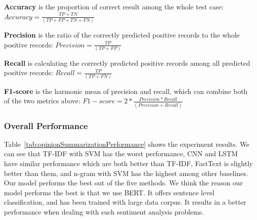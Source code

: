 \textbf{Accuracy} is the proportion of correct result among the whole test case: 
$ Accuracy = \frac{TP+TN}{(TP+FP+TN+FN)} $

\textbf{Precision} is the ratio of the correctly predicted positive records to the whole positive records:
$ Precision = \frac{TP}{(TP+FP)} $

\textbf{Recall} is calculating the correctly predicted positive records among all predicted positive records:
$ Recall = \frac{TP}{(TP+FN)} $

\textbf{F1-score}  is the harmonic mean of precision and recall, which can combine both of the two metrics above:
$ F1-score = 2*\frac{Precision*Recall}{(Precision+Recall)} $


\subsubsection{Overall Performance}
Table~\ref{tab:opinionSummarizationPerformance} shows the experiment results. We can see that TF-IDF with SVM has the worst performance, CNN and LSTM have similar performance which are both better than TF-IDF, FastText is slightly better than them, and n-gram with SVM has the highest among other baselines. Our model performs the best out of the five methods. 
We think the reason our model performs the best is that we use BERT. It offers sentence level classification, and has been trained with large data corpus. It results in a better performance when dealing with such sentiment analysis problems.

